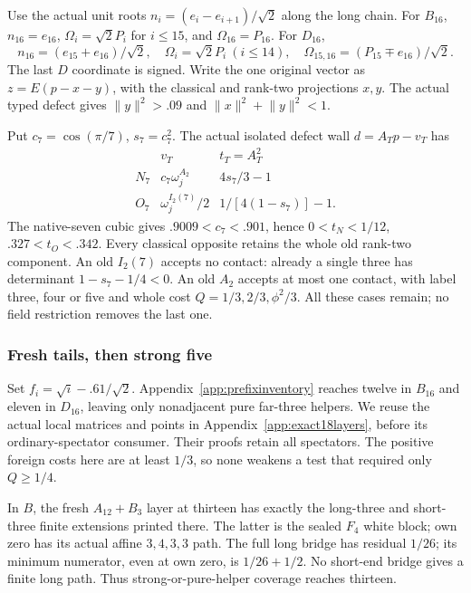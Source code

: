 \documentclass[11pt]{article}
\theoremstyle{definition}
\theoremstyle{remark}
\newcommand{\norm}[1]{\lVert #1\rVert}
\begin{document}
Use the actual unit roots \(n_i=(e_i-e_{i+1})/\sqrt2\) along
the long chain. For \(B_{16}\), \(n_{16}=e_{16}\),
\(\Omega_i=\sqrt2P_i\) for \(i\le15\), and
\(\Omega_{16}=P_{16}\). For \(D_{16}\),
\[
 n_{16}=(e_{15}+e_{16})/\sqrt2,\quad
 \Omega_i=\sqrt2P_i\ (i\le14),\quad
 \Omega_{15,16}=(P_{15}\mp e_{16})/\sqrt2.
\]
The last \(D\) coordinate is signed. Write the one original vector
as \(z=E(p-x-y)\), with the classical and rank-two projections
\(x,y\). The actual typed defect gives \(\norm y^2>.09\) and
\(\norm x^2+\norm y^2<1\).

Put \(c_7=\cos(\pi/7)\), \(s_7=c_7^2\).
The actual isolated defect wall \(d=A_Tp-v_T\) has
\[
\begin{array}{c|c|c}
&v_T&t_T=A_T^2\\\hline
N_7&c_7\omega_j^{A_2}&4s_7/3-1\\
O_7&\omega_j^{I_2(7)}/2&1/[4(1-s_7)]-1.
\end{array}
\]
The native-seven cubic gives \(.9009<c_7<.901\), hence
\(0<t_N<1/12\), \(.327<t_O<.342\).
Every classical opposite retains the whole old rank-two component.
An old \(I_2(7)\) accepts no contact: already a single three
has determinant \(1-s_7-1/4<0\). An old \(A_2\) accepts at
most one contact, with label three, four or five and whole cost
\(Q=1/3,2/3,\phi^2/3\). All these cases remain; no field
restriction removes the last one.

\subsubsection{Fresh tails, then strong five}
Set \(f_i=\sqrt i-.61/\sqrt2\). Appendix~\ref{app:prefixinventory}
reaches twelve in \(B_{16}\) and eleven in \(D_{16}\), leaving
only nonadjacent pure far-three helpers. We reuse the actual local
matrices and points in Appendix~\ref{app:exact18layers}, before
its ordinary-spectator consumer. Their proofs retain all spectators.
The positive foreign costs here are at least \(1/3\), so none
weakens a test that required only \(Q\ge1/4\).

In \(B\), the fresh \(A_{12}+B_3\) layer at thirteen has
exactly the long-three and short-three finite extensions printed
there. The latter is the sealed \(F_4\) white block; own zero
has its actual affine \(3,4,3,3\) path. The full long bridge
has residual \(1/26\); its minimum numerator, even at own zero,
is \(1/26+1/2\). No short-end bridge gives a finite long path.
Thus strong-or-pure-helper coverage reaches thirteen.
\end{document}
